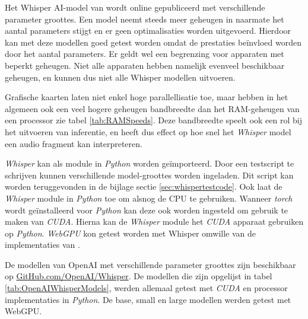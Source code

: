 Het Whisper AI-model van \textcite{OpenAI2023} wordt online gepubliceerd met verschillende parameter groottes. Een model neemt steeds meer geheugen in naarmate het aantal parameters stijgt en er geen optimalisaties worden uitgevoerd. Hierdoor kan met deze modellen goed getest worden omdat de prestaties beïnvloed worden door het aantal parameters. Er geldt wel een begrenzing voor apparaten met beperkt geheugen. Niet alle apparaten hebben namelijk evenveel beschikbaar geheugen, en kunnen dus niet alle Whisper modellen uitvoeren. 

\bigbreak{}

Grafische kaarten laten niet enkel hoge parallellisatie toe, maar hebben in het algemeen ook een veel hogere geheugen bandbreedte dan het RAM-geheugen van een processor zie tabel \ref{tab:RAMSpeeds}. Deze bandbreedte speelt ook een rol bij het uitvoeren van inferentie, en heeft dus effect op hoe snel het \textit{Whisper} model een audio fragment kan interpreteren.

\bigbreak{}

\textit{Whisper} kan als module in \textit{Python} worden geïmporteerd. Door een testscript te schrijven kunnen verschillende model-groottes worden ingeladen. Dit script kan worden teruggevonden in de bijlage sectie \ref{sec:whispertestcode}. Ook laat de \textit{Whisper} module in \textit{Python} toe om alsnog de CPU te gebruiken. Wanneer \textit{torch} wordt geïnstalleerd voor \textit{Python} kan deze ook worden ingesteld om gebruik te maken van \textit{CUDA}. Hierna kan de \textit{Whisper} module het \textit{CUDA} apparaat gebruiken op \textit{Python}. \textit{WebGPU} kon getest worden met Whisper omwille van de implementaties van \textcite{Fleetwood2024, Fleetwood2023b}.

\bigbreak{}

De modellen van OpenAI met verschillende parameter groottes zijn beschikbaar op \href{https://github.com/openai/whisper}{GitHub.com/OpenAI/Whisper}. De modellen die zijn opgelijst in tabel \ref{tab:OpenAIWhisperModels}, werden allemaal getest met \textit{CUDA} en processor implementaties in \textit{Python}. De base, small en large modellen werden getest met WebGPU.

